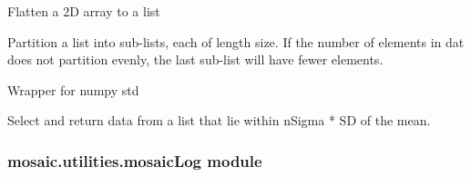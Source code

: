 \documentclass[letterpaper,10pt,english]{sphinxmanual}
\begin{document}
\begin{fulllineitems}
\label{api-doc/mosaic.misc:mosaic.utilities.util.flat2}
Flatten a 2D array to a list

\end{fulllineitems}


\begin{fulllineitems}
\label{api-doc/mosaic.misc:mosaic.utilities.util.partition}
Partition a list into sub-lists, each of length size. If the number of elements
in dat does not partition evenly, the last sub-list will have fewer elements.

\end{fulllineitems}


\begin{fulllineitems}
\label{api-doc/mosaic.misc:mosaic.utilities.util.sd}
Wrapper for numpy std

\end{fulllineitems}


\begin{fulllineitems}
\label{api-doc/mosaic.misc:mosaic.utilities.util.selectS}
Select and return data from a list that lie within
nSigma * SD of the mean.

\end{fulllineitems}



\subsubsection{mosaic.utilities.mosaicLog module}
\label{api-doc/mosaic.misc:mosaic-utilities-mosaiclog-module}
\end{document}
